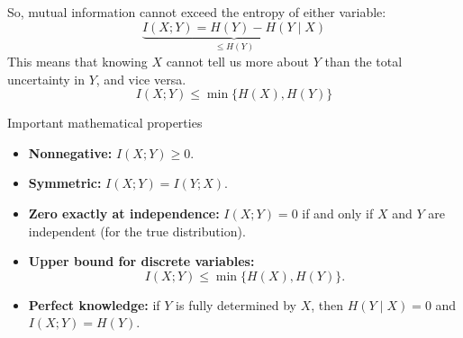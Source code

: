\documentclass[aspectratio=43,11pt]{beamer}
\begin{document}
\begin{frame}[t]{}
\small
\begin{center}
\end{center}
\vspace{-0.1cm}
\begin{center}
\begin{minipage}{0.975\textwidth}
\footnotesize
So, mutual information cannot exceed the entropy of either variable:
\[
\underbrace{
I(X;Y)=H(Y)-H(Y\mid X)
}_{\displaystyle \leq H(Y)}
\]
This means that knowing \(X\) cannot tell us more about \(Y\) than the total uncertainty in \(Y\), and vice versa.
\[
\boxed{
I(X;Y)\leq \min\{H(X),H(Y)\}
}
\]
\end{minipage}
\end{center}
\end{frame}

\begin{frame}{Important mathematical properties}
\begin{itemize}
\item \textbf{Nonnegative:} $I(X;Y)\geq 0$.
\item \textbf{Symmetric:} $I(X;Y)=I(Y;X)$.
\item \textbf{Zero exactly at independence:} $I(X;Y)=0$ if and only if $X$ and $Y$ are independent (for the true distribution).
\item \textbf{Upper bound for discrete variables:}
\[
I(X;Y)\leq\min\{H(X),H(Y)\}.
\]
\item \textbf{Perfect knowledge:} if $Y$ is fully determined by $X$, then $H(Y\mid X)=0$ and $I(X;Y)=H(Y)$.
\end{itemize}
\end{frame}
\end{document}
